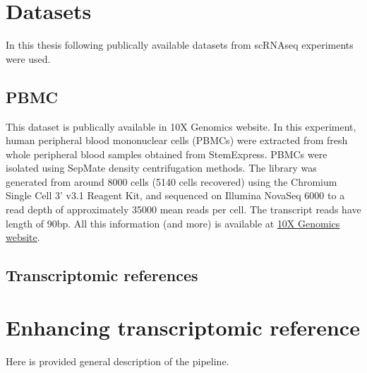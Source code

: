 \section{Datasets}

In this thesis following publically available datasets from scRNAseq experiments were used.

\subsection{PBMC}

This dataset is publically available in 10X Genomics website.
In this experiment, human peripheral blood mononuclear cells (PBMCs) were extracted from fresh whole peripheral blood samples obtained from StemExpress. PBMCs were isolated using SepMate density centrifugation methods.
The library was generated from around 8000 cells (5140 cells recovered) using the Chromium Single Cell 3' v3.1 Reagent Kit,
and sequenced on Illumina NovaSeq 6000 to a read depth of approximately 35000 mean reads per cell.
The transcript reads have length of 90bp.
All this information (and more) is available at
\href{https://www.10xgenomics.com/datasets/5k-human-pbmcs-3-v3-1-chromium-controller-3-1-standard}{10X Genomics website}.

\subsection{Transcriptomic references}

\section{Enhancing transcriptomic reference}

Here is provided general description of the pipeline.

